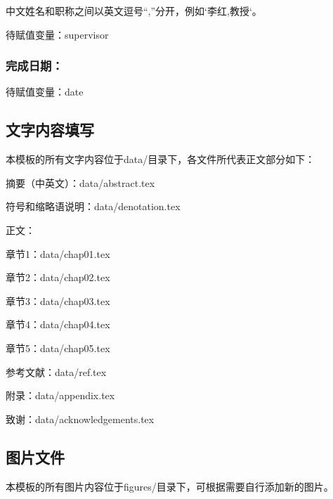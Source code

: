 中文姓名和职称之间以英文逗号“,”分开，例如`{李红,教授}`。

待赋值变量：supervisor

\subsubsection{完成日期：}

待赋值变量：date

\subsection{文字内容填写}

本模板的所有文字内容位于data/目录下，各文件所代表正文部分如下：

摘要（中英文）：data/abstract.tex

符号和缩略语说明：data/denotation.tex

正文：

\indent \indent 章节1：data/chap01.tex

\indent \indent 章节2：data/chap02.tex

\indent \indent 章节3：data/chap03.tex

\indent \indent 章节4：data/chap04.tex

\indent \indent 章节5：data/chap05.tex

参考文献：data/ref.tex

附录：data/appendix.tex

致谢：data/acknowledgements.tex


\subsection{图片文件}

本模板的所有图片内容位于figures/目录下，可根据需要自行添加新的图片。
